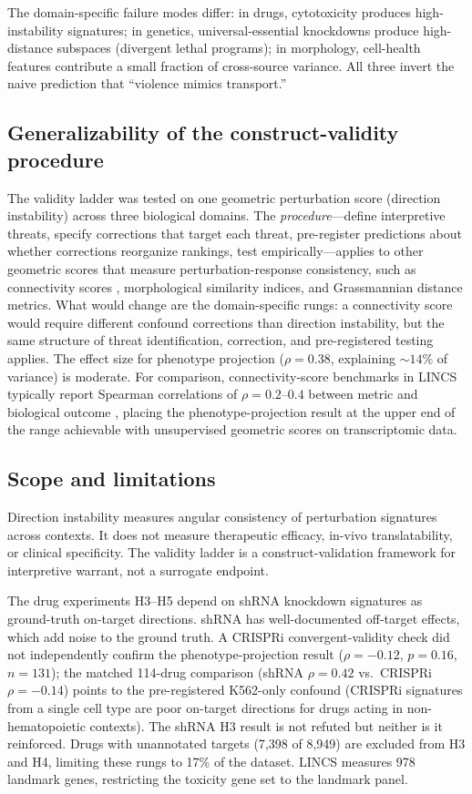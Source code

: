 \documentclass[11pt]{article}
\begin{document}
The domain-specific failure modes differ: in drugs, cytotoxicity
produces high-instability signatures; in genetics, universal-essential
knockdowns produce high-distance subspaces (divergent lethal programs);
in morphology, cell-health features contribute a small fraction of
cross-source variance. All three invert the naive prediction that
``violence mimics transport.''

\subsection{Generalizability of the construct-validity procedure}

The validity ladder was tested on one geometric perturbation score
(direction instability) across three biological domains. The
\emph{procedure}---define interpretive threats, specify corrections
that target each threat, pre-register predictions about whether
corrections reorganize rankings, test empirically---applies to other
geometric scores that measure perturbation-response consistency, such as
connectivity scores \citep{subramanian2017next}, morphological similarity
indices, and Grassmannian distance metrics. What would change are the
domain-specific rungs: a connectivity score would require different
confound corrections than direction instability, but the same
structure of threat identification, correction, and pre-registered
testing applies. The effect size for phenotype projection ($\rho = 0.38$,
explaining ${\sim}14\%$ of variance) is moderate. For comparison,
connectivity-score benchmarks in LINCS typically report Spearman
correlations of $\rho = 0.2$--$0.4$ between metric and biological
outcome \citep{li2020comprehensive}, placing the phenotype-projection
result at the upper end of the range achievable with unsupervised
geometric scores on transcriptomic data.

\subsection{Scope and limitations}

Direction instability measures angular consistency of perturbation signatures
across contexts. It does not measure therapeutic efficacy, in-vivo
translatability, or clinical specificity. The validity ladder is a
construct-validation framework for interpretive warrant, not a surrogate
endpoint.

The drug experiments H3--H5 depend on shRNA knockdown signatures as
ground-truth on-target directions. shRNA has well-documented off-target
effects, which add noise to the ground truth. A CRISPRi
convergent-validity check did not
independently confirm the phenotype-projection result ($\rho = -0.12$,
$p = 0.16$, $n = 131$); the matched 114-drug comparison (shRNA
$\rho = 0.42$ vs.\ CRISPRi $\rho = -0.14$) points to the
pre-registered K562-only confound (CRISPRi signatures from a single
cell type are poor on-target directions for drugs acting in
non-hematopoietic contexts). The shRNA H3 result is not refuted but
neither is it reinforced. Drugs with unannotated targets
(7{,}398 of 8{,}949) are excluded from H3 and H4, limiting these rungs
to 17\% of the dataset. LINCS measures 978 landmark genes, restricting
the toxicity gene set to the landmark panel.
\end{document}
